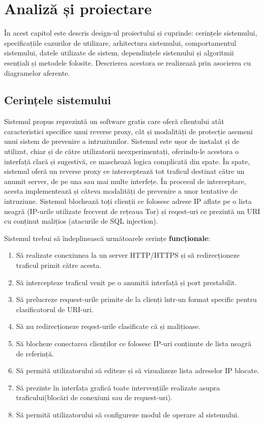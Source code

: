 \chapter{Analiză și proiectare}
\label{cap:analiza-si-proiectare}

În acest capitol este descris design-ul proiectului și cuprinde: cerințele sistemului, specificațiile cazurilor de utilizare, arhitectura sistemului, comportamentul sistemului, datele utilizate de sistem, dependințele sistemului și algoritmii esențiali și metodele folosite. Descrierea acestora se realizează prin asocierea cu diagramelor aferente. 

\section{Cerințele sistemului}

Sistemul propus \textit{\thesistitle}  reprezintă un software gratis care oferă clientului atât caracteristici specifice unui reverse proxy, cât și modalități de protecție asemeni unui sistem de prevenire a intruziunilor. 
Sistemul este ușor de instalat și de utilizat, chiar și de către utilizatorii neexperimentați, oferindu-le acestora o interfață clară și sugestivă, ce maschează logica complicată din spate. În spate, sistemul oferă un reverse proxy ce interceptează tot traficul destinat către un anumit server, de pe una sau mai multe interfețe. În procesul de interceptare, acesta implementează și câteva modalități de prevenire a unor tentative de intruziune. Sistemul blochează toți clienții ce folosesc adrese IP aflate pe o lista neagră (IP-urile utilizate frecvent de rețeaua Tor) și reqest-uri ce prezintă un URI cu conținut malițios (atacurile de SQL injection). 

Sistemul trebui să îndeplinească următoarele cerințe  \textbf{funcționale}:
\begin{enumerate}
	\item Să realizate conexiunea la un server HTTP/HTTPS și să redirecționeze traficul primit către acesta. 
	\item Să intercepteze traficul venit pe o anumită interfață și port prestabilit. 
	\item Să prelucreze request-urile primite de la clienți într-un format specific pentru clasificatorul de URI-uri. 
	\item Să nu redirecționeze reqest-urile clasificate că și malițioase. 
	\item Să blocheze conectarea clienților ce folosesc IP-uri conținute de lista neagră de referință. 
	\item Să permită utilizatorului să editeze și să vizualizeze lista adreselor IP blocate. 
	\item Să prezinte în interfața grafică toate intervențiile realizate asupra traficului(blocări de conexiuni sau de request-uri). 
	\item Să permită utilizatorului să configureze modul de operare al sistemului. 
\end{enumerate}

